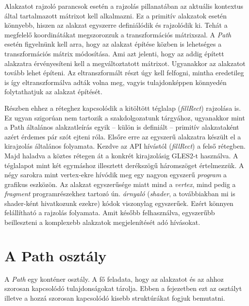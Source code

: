 \documentclass[12pt]{report}
\theoremstyle{definition}
\newcommand{\inenglish}[1]{\textsl{#1}}
\newcommand{\func}[1]{{\textsl{#1}}}
\begin{document}
Alakzatot rajzoló parancsok esetén a rajzolás pillanatában az aktuális
kontextus által tartalmazott mátrixot kell alkalmazni. Ez a primitív alakzatok
esetén könnyebb, hiszen az alakzat egyszerre definiálódik és rajzolódik ki.
Tehát a megfelelő koordinátákat megszorozzuk a transzformációs mátrixszal. A
\emph{Path} esetén figyelnünk kell arra, hogy az alakzat építése közben is
lehetséges a transzformációs mátrix módosítása. Ami azt jelenti, hogy az addig
épített alakzatra érvényesíteni kell a megváltoztatott mátrixot. Ugyanakkor az
alakzatot tovább lehet építeni. Az eltranszformált részt úgy kell felfogni,
mintha eredetileg is így eltranszformálva adták volna meg, vagyis
tulajdonképpen könnyedén folytathatjuk az alakzat építését.

Részben ehhez a réteghez kapcsolódik a kitöltött téglalap (\func{fillRect})
rajzolása is. Ez ugyan szigorúan nem tartozik a szakdolgozatunk tárgyához,
ugyanakkor mint a Path általános alakzatleírás egyik -- külön is definiált --
primitív alakzataként azért érdemes pár szót ejteni róla. Elsőre erre az
egyszerű alakzatra készült el a kirajzolás általános folyamata. Kezdve az API
hívástól (\func{fillRect}) a felső rétegben. Majd haladva a köztes rétegen át a
konkrét kirajzolásig GLES2-t használva. A téglalapot mint két egymáshoz
illesztett derékszögű háromszöget értelmezzük. A négy sarokra mint vertex-ekre
hívódik meg egy nagyon egyszerű \emph{program} a grafikus eszközön. Az alakzat
egyszerűsége miatt mind a \emph{vertex}, mind pedig a \emph{fragment}
programrészekhez tartozó ún. \emph{árnyaló} (\inenglish{shader}, a továbbiakban
mi is shader-ként hivatkozunk ezekre) kódok viszonylag egyszerűek. Ezért
könnyen felállítható a rajzolás folyamata. Amit később felhasználva, egyszerűbb
beilleszteni a komplexebb alakzatok megjelenítését adó hívásokat.

    \section[A Path osztály]{A Path osztály}
    \label{sec:A Path_osztály}

A \func{Path} egy konténer osztály. A fő feladata, hogy az alakzatot és az
ahhoz szorosan kapcsolódó tulajdonságokat tárolja. Ebben a fejezetben ezt az
osztályt illetve a hozzá szorosan kapcsolódó kisebb struktúrákat fogjuk
bemutatni.
\end{document}
